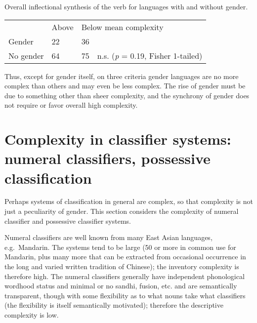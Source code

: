 \documentclass[output=collectionpaper]{langsci/langscibook}
\begin{document}
\ea
Overall inflectional synthesis of the verb for languages with and without gender.\\
\medskip
\begin{tabular}{p{2.7cm}p{1.3cm}p{1.3cm}l}
		 &	Above 	 &	\multicolumn{2}{l}{Below mean complexity} \\
	Gender	 &	22	 &	36 \\
	No gender  &	64	 &	75	 &	n.s. (\textit{p} = 0.19, Fisher 1-tailed) \\
\end{tabular}
\z

Thus, except for gender itself, on three criteria gender languages are no more complex than others and may even be less complex. The rise of gender must be due to something other than sheer complexity, and the synchrony of gender does not require or favor overall high complexity.


\section{Complexity in classifier systems: numeral classifiers, possessive classification}
\label{sec:Nich:4}

Perhaps systems of classification in general are complex, so that complexity is not just a peculiarity of gender. This section considers the complexity of numeral classifier and possessive classifier systems.

	Numeral classifiers are well known from many East Asian languages, e.g.\ Mandarin. The systems tend to be large (50 or more in common use for Mandarin, plus many more that can be extracted from occasional occurrence in the long and varied written tradition of Chinese); the inventory complexity is therefore high. The numeral classifiers generally have independent phonological wordhood status and minimal or no sandhi, fusion, etc. and are semantically transparent, though with some flexibility as to what nouns take what classifiers (the flexibility is itself semantically motivated); therefore the descriptive complexity is low.
\end{document}
